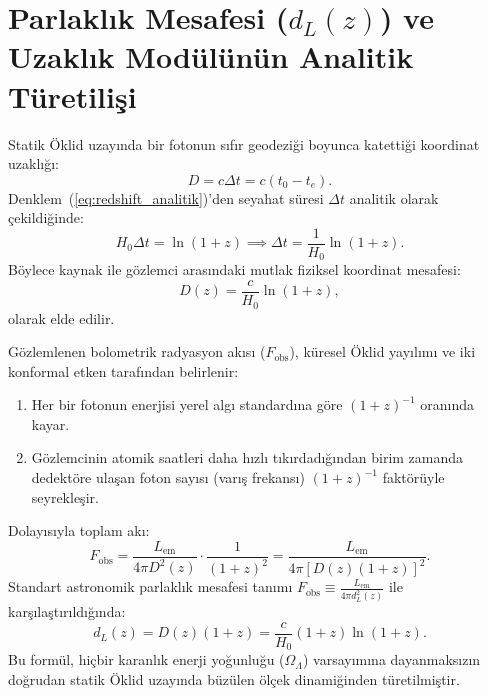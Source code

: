 \documentclass[11pt,a4paper]{article}
\begin{document}
\section{Parlaklık Mesafesi (\texorpdfstring{$d_L(z)$}{dL(z)}) ve Uzaklık Modülünün Analitik Türetilişi}
\label{sec:dl_turetilis}

Statik Öklid uzayında bir fotonun sıfır geodeziği boyunca katettiği koordinat uzaklığı:
\begin{equation}
    D = c \Delta t = c (t_0 - t_e).
\end{equation}
Denklem~(\ref{eq:redshift_analitik})'den seyahat süresi $\Delta t$ analitik olarak çekildiğinde:
\begin{equation}
    H_0 \Delta t = \ln(1 + z) \implies \Delta t = \frac{1}{H_0} \ln(1 + z).
\end{equation}
Böylece kaynak ile gözlemci arasındaki mutlak fiziksel koordinat mesafesi:
\begin{equation}
    D(z) = \frac{c}{H_0} \ln(1 + z),
    \label{eq:koordinat_mesafe}
\end{equation}
olarak elde edilir.

Gözlemlenen bolometrik radyasyon akısı ($F_{\mathrm{obs}}$), küresel Öklid yayılımı ve iki konformal etken tarafından belirlenir:
\begin{enumerate}
    \item Her bir fotonun enerjisi yerel algı standardına göre $(1+z)^{-1}$ oranında kayar.
    \item Gözlemcinin atomik saatleri daha hızlı tıkırdadığından birim zamanda dedektöre ulaşan foton sayısı (varış frekansı) $(1+z)^{-1}$ faktörüyle seyrekleşir.
\end{enumerate}
Dolayısıyla toplam akı:
\begin{equation}
    F_{\mathrm{obs}} = \frac{L_{\mathrm{em}}}{4\pi D^2(z)} \cdot \frac{1}{(1+z)^2} = \frac{L_{\mathrm{em}}}{4\pi \left[ D(z) (1+z) \right]^2}.
    \label{eq:aku_formulu}
\end{equation}
Standart astronomik parlaklık mesafesi tanımı $F_{\mathrm{obs}} \equiv \frac{L_{\mathrm{em}}}{4\pi d_L^2(z)}$ ile karşılaştırıldığında:
\begin{equation}
    \boxed{ d_L(z) = D(z) (1 + z) = \frac{c}{H_0} (1 + z) \ln(1 + z). }
    \label{eq:dl_ana_formulu}
\end{equation}
Bu formül, hiçbir karanlık enerji yoğunluğu ($\Omega_\Lambda$) varsayımına dayanmaksızın doğrudan statik Öklid uzayında büzülen ölçek dinamiğinden türetilmiştir.
\end{document}
